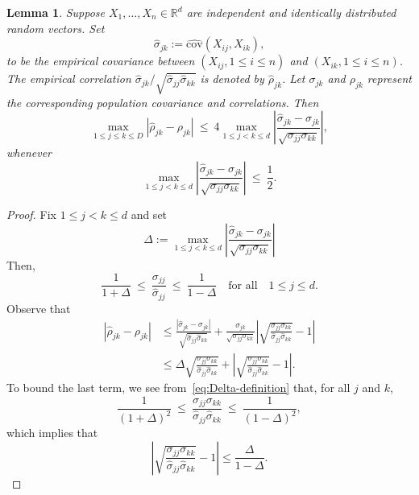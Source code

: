 \documentclass[11pt]{article}
\newtheorem{lemma}[theorem]{Lemma}
\begin{document}
\begin{appendices}
\begin{lemma}\label{lem:correlations-from-covariances}
Suppose $X_1, \ldots, X_n\in\mathbb{R}^d$ are independent and identically distributed random vectors. Set
\[
\widehat{\sigma}_{jk} := \widehat{\mathrm{cov}}(X_{ij}, X_{ik}),
\]
to be the empirical covariance between $(X_{ij}, 1\le i\le n)$ and $(X_{ik}, 1\le i\le n)$. The empirical correlation $\widehat{\sigma}_{jk}/\sqrt{\widehat{\sigma}_{jj}\widehat{\sigma}_{kk}}$ is denoted by $\widehat{\rho}_{jk}$. Let $\sigma_{jk}$ and $\rho_{jk}$ represent the corresponding population covariance and correlations. Then
\[
\max_{1\le j \le k\le D}\left|\widehat{\rho}_{jk} - {\rho}_{jk}\right| ~\le~ 4\max_{1\le j < k\le d}\left|\frac{\widehat{\sigma}_{jk} - \sigma_{jk}}{\sqrt{\sigma_{jj}\sigma_{kk}}}\right|,
\]
whenever
\[
\max_{1\le j < k\le d}\left|\frac{\widehat{\sigma}_{jk} - \sigma_{jk}}{\sqrt{\sigma_{jj}\sigma_{kk}}}\right| ~\le~ \frac{1}{2}.
\]
\end{lemma}
\begin{proof}
Fix $1\le j < k\le d$ and set
\[
\Delta := \max_{1\le j < k\le d}\left|\frac{\widehat{\sigma}_{jk} - \sigma_{jk}}{\sqrt{\sigma_{jj}\sigma_{kk}}}\right|
\]
Then,
\begin{equation}\label{eq:Delta-definition}
 \frac{1}{1 + \Delta} ~\le~ \frac{\sigma_{jj}}{\widehat{\sigma}_{jj}} ~\le~ \frac{1}{1-\Delta}\quad\mbox{for all}\quad 1\le j\le d.
\end{equation}
Observe that
\begin{align*}
\left|\widehat{\rho}_{jk} - \rho_{jk}\right| &\le \frac{|\widehat{\sigma}_{jk} - \sigma_{jk}|}{\sqrt{\widehat{\sigma}_{jj}\widehat{\sigma}_{kk}}} + \frac{\sigma_{jk}}{\sqrt{\sigma_{jj}\sigma_{kk}}}\left|\sqrt{\frac{\sigma_{jj}\sigma_{kk}}{\widehat{\sigma}_{jj}\widehat{\sigma}_{kk}}} - 1\right|\\
&\le \Delta\sqrt{\frac{\sigma_{jj}\sigma_{kk}}{\widehat{\sigma}_{jj}\widehat{\sigma}_{kk}}} + \left|\sqrt{\frac{\sigma_{jj}\sigma_{kk}}{\widehat{\sigma}_{jj}\widehat{\sigma}_{kk}}} - 1\right|.%
\end{align*}
To bound the last term, we see from~\eqref{eq:Delta-definition} that, for all $j$ and $k$,
\[
\frac{1}{(1+\Delta)^2} ~\le~ \frac{\sigma_{jj}\sigma_{kk}}{\widehat{\sigma}_{jj}\widehat{\sigma}_{kk}} ~\le~ \frac{1}{(1 - \Delta)^2}, 
\]
which implies that
\[
\left|\sqrt{\frac{\sigma_{jj}\sigma_{kk}}{\widehat{\sigma}_{jj}\widehat{\sigma}_{kk}}} - 1\right| \le \frac{\Delta}{1 - \Delta}.
\]
\end{proof}
\end{appendices}
\end{document}

